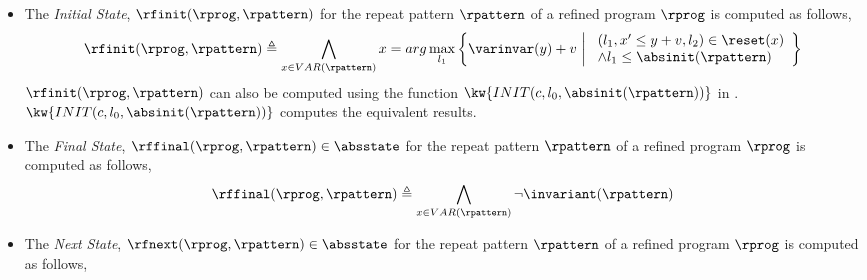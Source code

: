   \begin{defn}
    \label{def:edge_pathinsensitivebound}
 \begin{itemize}
   The computations of $\outinB(\rprepeat({\rpattern}))$ and $\rfinit(\rprog, \rpattern)$,
   $\rffinal(\rprog, \rpattern)$, $\rfnext(\rprog, \rpattern)$ and $\varGD(\rprog, \rpattern) \in \mathcal{A}_{in}$
   are formally presented as follows.
   \item The \emph{Initial State}, $\rfinit(\rprog, \rpattern)$ for the repeat pattern $\rpattern$ of a refined program $\rprog$ is computed as follows,
   \[
     \rfinit(\rprog, \rpattern) \triangleq 
     \bigwedge_{x \in VAR(\rpattern)}
     x
     = arg\max_{l_1}\left\{
       \varinvar(y) + v ~\middle\vert~ 
       \begin{array}{l} 
         (l_1, x' \leq y + v, l_2) \in \reset(x) 
         \\
       \land l_1 \leq \absinit(\rpattern)
     \end{array}
     \right\}
     \]
   $\rfinit(\rprog, \rpattern)$ can also be computed using the function $\kw{INIT(c, l_0, \absinit(\rpattern))}$ in \cite{GulwaniJK09}. 
   $\kw{INIT(c, l_0, \absinit(\rpattern))}$ computes the equivalent results.
   \item  The {\emph{Final State}, $\rffinal(\rprog, \rpattern) \in \absstate$ for the repeat pattern $\rpattern$ of a refined program $\rprog$ is computed as follows, }
   \[
     \rffinal(\rprog, \rpattern) \triangleq 
     \bigwedge_{x \in VAR(\rpattern)}
     \neg \invariant(\rpattern)
     \]
   \item The \emph{Next State}, $\rfnext(\rprog, \rpattern) \in \absstate$ for the repeat pattern $\rpattern$ of a refined program $\rprog$ is computed as follows,

\end{itemize}
\end{defn}
